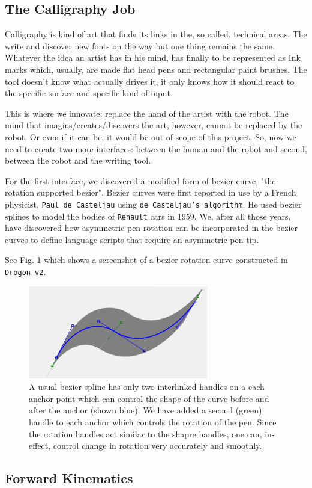 \subsection{The Calligraphy Job}
{
        Calligraphy is kind of art that finds its links in the, so called, technical areas. The write and discover new fonts on the way but one thing remains the same. Whatever the idea an artist has in his mind, has finally to be represented as Ink marks which, usually, are made flat head pens and rectangular paint brushes. The tool doesn't know what actually drives it, it only knows how it should react to the specific surface and specific kind of input.

        This is where we innovate: replace the hand of the artist with the robot. The mind that imagins/creates/discovers the art, however, cannot be replaced by the robot. Or even if it can be, it would be out of scope of this project. So, now we need to create two more interfaces: between the human and the robot and second, between the robot and the writing tool.

        For the first interface, we discovered a modified form of bezier curve, "the rotation supported bezier". Bezier curves were first reported in use by a French physicist, \texttt{Paul de Casteljau} using \texttt{de Casteljau's algorithm}. He used bezier splines to model the bodies of \texttt{Renault} cars in 1959. We, after all those years, have discovered how asymmetric pen rotation can be incorporated in the bezier curves to define language scripts that require an asymmetric pen tip.

        See Fig. \ref{FigBezier} which shows a screenshot of a bezier rotation curve constructed in \texttt{Drogon v2}.

        \begin{figure}
          \centering
          \includegraphics[width=0.7\textwidth]{bezier.png}
          \caption{A usual bezier spline has only two interlinked handles on a each anchor point which can control the shape of the curve before and after the anchor (shown blue). We have added a second (green) handle to each anchor which controls the rotation of the pen. Since the rotation handles act similar to the shapre handles, one can, in-effect, control change in rotation very accurately and smoothly.
          } \label{FigBezier}
        \end{figure}

    }
\subsection{Forward Kinematics}